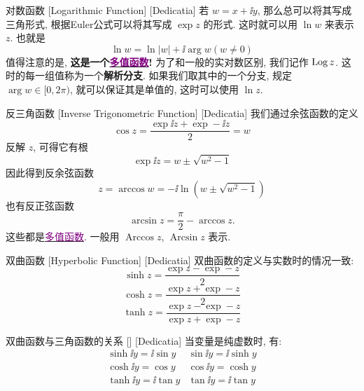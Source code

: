 \documentclass[UTF8]{ctexart}
\newcommand{\hyperrefc}[2]{\hyperref[#1]{\textcolor{purple}{#2}}}
\begin{document}
        \begin{dfn}
            [Logarithmic]
            {对数函数}
            [Logarithmic Function]
            [Dedicatia]
            若 \(w=x+\ii y\), 那么总可以将其写成三角形式, 根据Euler公式可以将其写成 \(\exp z\) 的形式. 这时就可以用 \(\ln w\) 来表示 \(z\). 也就是
            \[\ln w=\ln|w|+\ii\arg w (w\neq 0)\]
            值得注意的是, \textbf{这是一个\hyperrefc{dfn:Multivalued}{多值函数}! }为了和一般的实对数区别, 我们记作 \(\operatorname{Log} z\). 这时的每一组值称为一个\textbf{解析分支}. 如果我们取其中的一个分支, 规定 \(\arg w\in[0,2\pi)\), 就可以保证其是单值的, 这时可以使用 \(\ln z\).
        \end{dfn}

        \begin{dfn}
            [InverseTriangular]
            {反三角函数}
            [Inverse Trigonometric Function]
            [Dedicatia]
            我们通过余弦函数的定义
            \[\cos z=\frac{\exp\ii z+\exp -\ii z}{2}=w\]
            反解 \(z\), 可得它有根
            \[\exp\ii z=w\pm\sqrt{w^2-1}\]
            因此得到反余弦函数
            \[z=\arccos w=-\ii\ln(w\pm\sqrt{w^2-1})\]
            也有反正弦函数
            \[\arcsin z=\frac{\pi}{2}-\arccos z.\]
            这些都是\hyperrefc{dfn:Multivalued}{多值函数}. 一般用 \(\operatorname{Arccos}z\),  \(\operatorname{Arcsin}z\) 表示. \\
        \end{dfn}

        \begin{dfn}
            [HyperbolicFunction]
            {双曲函数}
            [Hyperbolic Function]
            [Dedicatia]
            双曲函数的定义与实数时的情况一致: 
            \[\sinh z=\frac{\exp z-\exp -z}{2}\]
            \[\cosh z=\frac{\exp z+\exp -z}{2}\]
            \[\tanh z=\frac{\exp z-\exp -z}{\exp z+\exp -z}\]
        \end{dfn}

        \begin{ppt}
            [UUID]
            {双曲函数与三角函数的关系}
            []
            [Dedicatia]
            当变量是纯虚数时, 有: 
            \[\begin{array}{cc}
                \sinh\ii y=\ii\sin y&\sin\ii y=\ii\sinh y\\
                \cosh\ii y=\cos y&\cos\ii y=\cosh y\\
                \tanh\ii y=\ii\tan y&\tan\ii y=\ii\tan y
            \end{array}\]
        \end{ppt}
\end{document}
